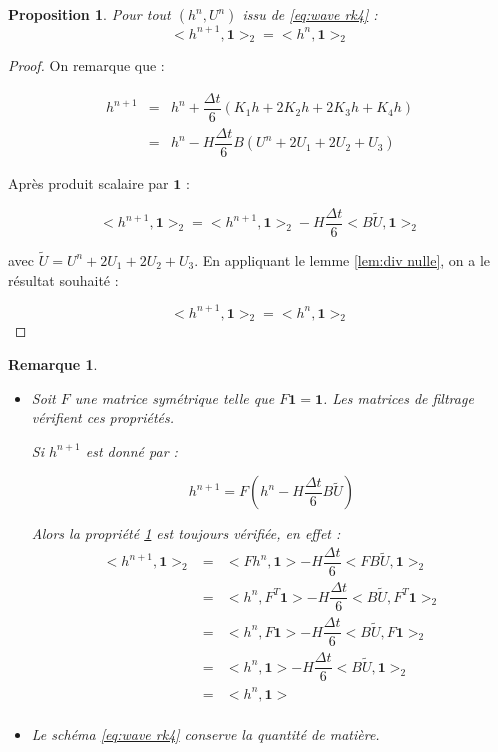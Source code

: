 \documentclass[10pt,a4paper]{article}
\newtheorem{proposition}{Proposition}
\newtheorem{remarque}{Remarque}
\begin{document}
\begin{proposition}
Pour tout $(h^n,U^n)$ issu de \eqref{eq:wave rk4} :
\begin{equation}
<h^{n+1},\mathbf{1}>_2 = <h^{n},\mathbf{1}>_2
\end{equation}
\label{prop:conservation rk4}
\end{proposition}

\begin{proof}
On remarque que : 

$$
\begin{array}{rcl}
h^{n+1} & = & h^n + \dfrac{\Delta t}{6} \left( K_1h + 2 K_2 h + 2 K_3 h + K_4 h \right) \\
        & = & h^n - H \dfrac{\Delta t}{6} B \left( U^n + 2 U_1 + 2 U_2 + U_3 \right)
\end{array}
$$

Après produit scalaire par $\mathbf{1}$ :

$$
<h^{n+1},\mathbf{1}>_2 = <h^{n+1},\mathbf{1}>_2 - H \dfrac{\Delta t}{6} <B \tilde{U}, \mathbf{1}>_2
$$

avec $\tilde{U} = U^n + 2 U_1 + 2 U_2 + U_3$.
En appliquant le lemme \ref{lem:div nulle}, on a le résultat souhaité :

$$
<h^{n+1},\mathbf{1}>_2 = <h^{n},\mathbf{1}>_2
$$
\end{proof}

\begin{remarque}
\begin{itemize}
\item Soit $F$ une matrice symétrique telle que $F \mathbf{1} = \mathbf{1}$. Les matrices de filtrage vérifient ces propriétés.

Si $h^{n+1}$ est donné par :

$$
h^{n+1} = F \left( h^n  - H \dfrac{\Delta t}{6} B \tilde{U} \right)
$$

Alors la propriété \ref{prop:conservation rk4} est toujours vérifiée, en effet :
$$
\begin{array}{rcl}
<h^{n+1},\mathbf{1}>_2 & = & <Fh^n, \mathbf{1}> - H \dfrac{\Delta t}{6} <FB\tilde{U},\mathbf{1}>_2 \\
                       & = & <h^n, F^T \mathbf{1}> - H \dfrac{\Delta t}{6} <B\tilde{U},F^T\mathbf{1}>_2\\
                       & = & <h^n, F \mathbf{1}> - H \dfrac{\Delta t}{6} <B\tilde{U},F\mathbf{1}>_2\\
                       & = & <h^n, \mathbf{1}> - H \dfrac{\Delta t}{6} <B\tilde{U},\mathbf{1}>_2\\
                       & = & <h^n, \mathbf{1}> \\
\end{array}
$$
\item Le schéma \eqref{eq:wave rk4} conserve la quantité de matière.
\end{itemize}

\end{remarque}
\end{document}
